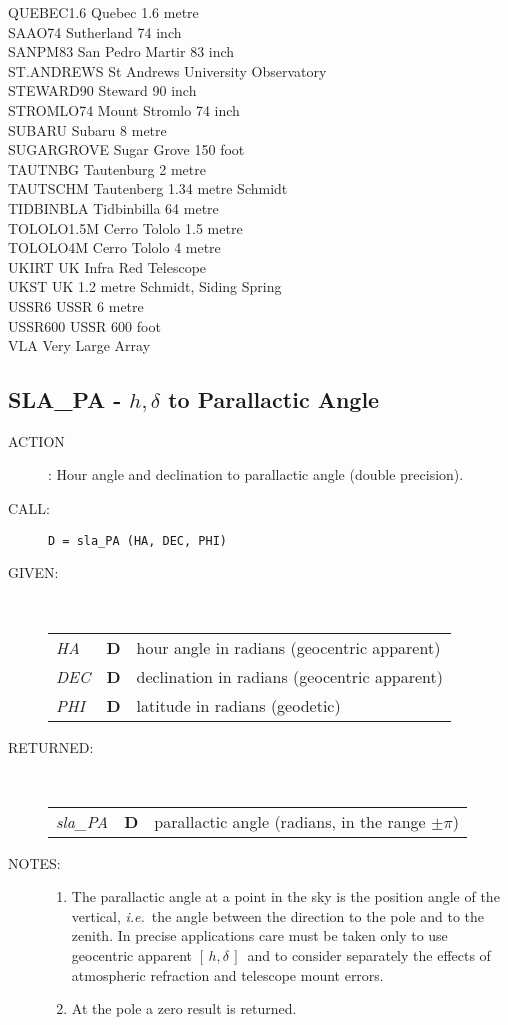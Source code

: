 \documentclass[11pt,twoside]{article}
\newcommand{\xlabel}[1]{}
\newcommand{\hadec}     {$[\,h,\delta\,]$}
\newcommand{\routine}[3]
{\hbadness=10000
  \vbox
  {
    \rule{\textwidth}{0.3mm}\\
    {\Large {\bf #1} \hfill #2 \hfill {\bf #1}}\\
    \setlength{\oldspacing}{\topsep}
    \setlength{\topsep}{0.3ex}
    \begin{description}
      #3
    \end{description}
    \setlength{\topsep}{\oldspacing}
  }
}
\renewcommand{\routine}[3]
   {
      \subsection{#1\xlabel{#1} - #2\label{#1}}
       \begin{description}
         #3
       \end{description}
   }
\newcommand{\action}[1]
{\item[ACTION]: #1}
\newcommand{\action}[1]
   {\item[ACTION:] #1}
\newcommand{\call}[1]
{\item[CALL]: \hspace{0.4em}{\tt #1}}
\newlength{\oldspacing}
\renewcommand{\call}[1]
   {
    \item[CALL:] {\tt #1}
   }
\newcommand{\args}[2]
{
  \goodbreak
  \setlength{\oldspacing}{\topsep}
  \setlength{\topsep}{0.3ex}
  \begin{description}
  \item[#1]:\\[1.5ex]
    \begin{tabular}{p{7em}p{6em}p{22em}}
      #2
    \end{tabular}
  \end{description}
  \setlength{\topsep}{\oldspacing}
}
\renewcommand{\args}[2]
   {
     \begin{description}
        \item[#1:]\\
        \begin{tabular}{p{7em}p{6em}l}
           #2
        \end{tabular}
     \end{description}
   }
\newcommand{\spec}[3]
{
  {\em {#1}} & {\bf \mbox{#2}} & {#3}
}
\newcommand{\notes}[1]
{
  \goodbreak
  \setlength{\oldspacing}{\topsep}
  \setlength{\topsep}{0.3ex}
  \begin{description}
    \item[NOTES]:
        #1
  \end{description}
  \setlength{\topsep}{\oldspacing}
}
\renewcommand{\notes}[1]
   {
      \begin{description}
         \item[NOTES:]
            #1
      \end{description}
   }
\begin{document}
{\begin{tabbing}
QUEBEC1.6 \> Quebec 1.6 metre \\
SAAO74 \> Sutherland 74 inch \\
SANPM83 \> San Pedro Martir 83 inch \\
ST.ANDREWS \> St Andrews University Observatory \\
STEWARD90 \> Steward 90 inch \\
STROMLO74 \> Mount Stromlo 74 inch \\
SUBARU \> Subaru 8 metre \\
SUGARGROVE \> Sugar Grove 150 foot \\
TAUTNBG \> Tautenburg 2 metre \\
TAUTSCHM \> Tautenberg 1.34 metre Schmidt \\
TIDBINBLA \> Tidbinbilla 64 metre \\
TOLOLO1.5M \> Cerro Tololo 1.5 metre \\
TOLOLO4M \> Cerro Tololo 4 metre \\
UKIRT \> UK Infra Red Telescope \\
UKST \> UK 1.2 metre Schmidt, Siding Spring \\
USSR6 \> USSR 6 metre \\
USSR600 \> USSR 600 foot \\
VLA \> Very Large Array
\end{tabbing}
}
\routine{SLA\_PA}{$h,\delta$ to Parallactic Angle}
{
 \action{Hour angle and declination to parallactic angle
         (double precision).}
 \call{D~=~sla\_PA (HA, DEC, PHI)}
}
\args{GIVEN}
{
 \spec{HA}{D}{hour angle in radians (geocentric apparent)} \\
 \spec{DEC}{D}{declination in radians (geocentric apparent)} \\
 \spec{PHI}{D}{latitude in radians (geodetic)}
}
\args{RETURNED}
{
 \spec{sla\_PA}{D}{parallactic angle (radians, in the range $\pm \pi$)}
}
\notes
{
 \begin{enumerate}
  \item The parallactic angle at a point in the sky is the position
        angle of the vertical, {\it i.e.}\ the angle between the direction to
        the pole and to the zenith.  In precise applications care must
        be taken only to use geocentric apparent \hadec\ and to consider
        separately the effects of atmospheric refraction and telescope
        mount errors.
  \item At the pole a zero result is returned.
 \end{enumerate}
}
\end{document}
